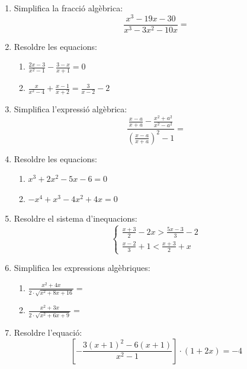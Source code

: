\documentclass[12pt,a4paper]{article}
\begin{document}
\begin{enumerate}[label=\textbf{\arabic*.}]
    
    \item Simplifica la fracció algèbrica:
    \[
    \frac{x^{3}-19x-30}{x^{3}-3x^{2}-10x} =
    \]

    \item Resoldre les equacions:
    \begin{enumerate}[label=\alph*)]
        \item $\displaystyle \frac{2x-3}{x^{2}-1}-\frac{3-x}{x+1}=0$
        \vspace{0.3cm} %
        \item $\displaystyle \frac{x}{x^{2}-4}+\frac{x-1}{x+2}=\frac{3}{x-2}-2$
    \end{enumerate}

    \item Simplifica l'expressió algèbrica:
    \[
    \frac{\frac{x-a}{x+a}-\frac{x^{2}+a^{2}}{x^{2}-a^{2}}}{\left(\frac{x-a}{x+a}\right)^{2}-1} =
    \]

    \item Resoldre les equacions:
    \begin{enumerate}[label=\alph*)]
        \item $x^{3}+2x^{2}-5x-6=0$
        \item $-x^{4}+x^{3}-4x^{2}+4x=0$
    \end{enumerate}

    \item Resoldre el sistema d'inequacions:
    \[
    \begin{cases}
    \displaystyle \frac{x+3}{2}-2x > \frac{5x-3}{3}-2 \\[10pt]
    \displaystyle \frac{x-2}{3}+1 < \frac{x+3}{2}+x
    \end{cases}
    \]

    \item Simplifica les expressions algèbriques:
    \begin{enumerate}[label=\alph*)]
        \item $\displaystyle \frac{x^{2}+4x}{2\cdot\sqrt{x^{2}+8x+16}} =$
        \vspace{0.3cm}
        \item $\displaystyle \frac{x^{2}+3x}{2\cdot\sqrt{x^{2}+6x+9}} =$
    \end{enumerate}

    \item Resoldre l'equació:
    \[
    \left[-\frac{3(x+1)^{2}-6(x+1)}{x^{2}-1}\right]\cdot(1+2x)=-4
    \]


\end{enumerate}
\end{document}
